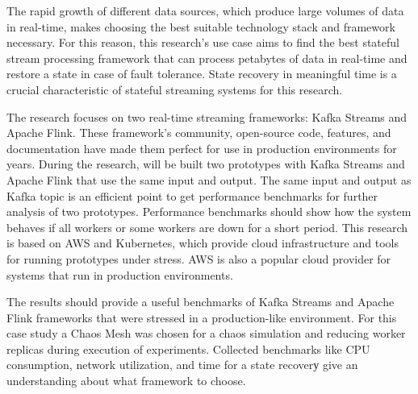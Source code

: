 The rapid growth of different data sources, which produce large volumes of data in
real-time, makes choosing the best suitable technology stack and framework necessary.
For this reason, this research’s use case aims to find the best stateful stream processing framework that
can process petabytes of data in real-time and restore a state in case of fault tolerance.
State recovery in meaningful time is a crucial characteristic of stateful streaming systems
for this research.

\hspace{2em}The research focuses on two real-time streaming frameworks: Kafka
Streams and Apache Flink. These framework's community, open-source code, features,
and documentation have made them perfect for use in production environments for years.
During the research, will be built two prototypes with Kafka Streams and Apache Flink
that use the same input and output. The same input and output as Kafka topic is an efficient
point to get performance benchmarks for further analysis of two prototypes. Performance
benchmarks should show how the system behaves if all workers or some workers are down
for a short period.
This research is based on AWS and Kubernetes, which provide cloud infrastructure and
tools for running prototypes under stress. AWS is also a popular cloud provider for systems
that run in production environments.

\hspace{2em}The results should provide a useful benchmarks of Kafka Streams and Apache Flink frameworks that were
stressed in a production-like environment.
For this case study a
Chaos Mesh was chosen for a chaos simulation and reducing worker replicas during execution of experiments.
Collected benchmarks like CPU consumption, network utilization, and time for a state recoverу give an understanding
about what framework to choose.


